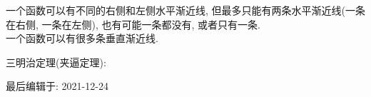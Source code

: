 一个函数可以有不同的右侧和左侧水平渐近线, 但最多只能有两条水平渐近线(一条在右侧, 一条在左侧), 也有可能一条都没有, 或者只有一条.\\

一个函数可以有很多条垂直渐近线.\\\vspace{4ex}

三明治定理(夹逼定理):
{\par\centering
{}
\par}

最后编辑于: 2021-12-24
